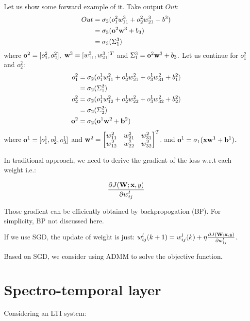 \documentclass[11pt,a4paper]{article}
\begin{document}
Let us show some forward example of it. Take output $Out$:
\begin{align}
Out &= \sigma_3(o^2_1w^3_{11} + o^2_2w^3_{21} + b^3)\\
&= \sigma_3(\mathbf{o}^2\mathbf{w}^3 + b_3)\\
&= \sigma_3(\Sigma^3_1)
\end{align}
where $\mathbf{o}^2 = [o^2_1, o^2_2]$, $\mathbf{w}^3 = [w^3_{11}, w^3_{21}]^T$ and $\Sigma^3_1 = \mathbf{o}^2\mathbf{w}^3 + b_3$.
Let us continue for $o^2_1$ and $o^2_2$:
\begin{align}
o^2_1 &= \sigma_2(o^1_1w^2_{11} + o^1_2w^2_{21} + o^1_3w^2_{31} + b^2_1)\\
&= \sigma_2(\Sigma^2_1)\\
o^2_2 &= \sigma_2(o^1_1w^2_{12} + o^1_2w^2_{22} + o^1_3w^2_{32} + b^2_2)\\
&= \sigma_2(\Sigma^2_2)\\
\mathbf{o}^2 &= \sigma_2(\mathbf{o}^1\mathbf{w}^2 + \mathbf{b}^2)
\end{align}
where $\mathbf{o}^1 = [o^1_1, o^1_2, o^1_3]$ and $\mathbf{w}^2 = \begin{bmatrix}
w^2_{11} & w^2_{21} & w^2_{31}\\
w^2_{12} & w^2_{22} & w^2_{32}
\end{bmatrix}^T$. and $\mathbf{o}^1 = \sigma_1(\mathbf{x}\mathbf{w}^1 + \mathbf{b}^1)$. 

In traditional approach, we need to derive the gradient of the loss w.r.t each weight i.e.:

\begin{equation}
\frac{\partial J(\mathbf{W}; \mathbf{x}, y)}{\partial w^l_{ij}}
\end{equation}

Those gradient can be efficiently obtained by backpropogation (BP). For simplicity, BP not discussed here. 

If we use SGD, the update of weight is just: $w^l_{ij}(k+1) = w^l_{ij}(k) + \eta \frac{\partial J(\mathbf{W}; \mathbf{x}, y)}{\partial w^l_{ij}}$.

Based on SGD, we consider using ADMM to solve the objective function. 


\section{Spectro-temporal layer}

Considering an LTI system:
\end{document}
